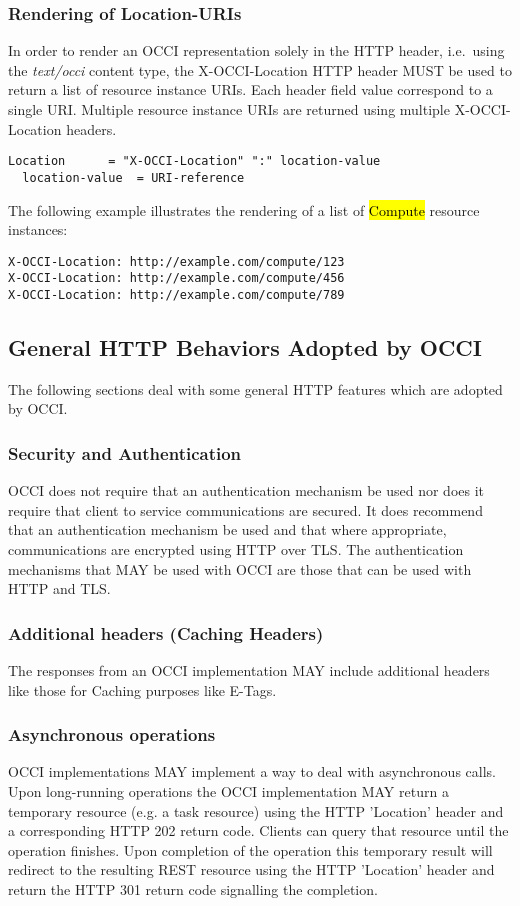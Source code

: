 \documentclass[10pt,a4paper]{article}
\begin{document}
\subsubsection{Rendering of Location-URIs}
In order to render an OCCI representation solely in the HTTP header,
i.e.~using the \textit{text/occi} content type, the X-OCCI-Location
HTTP header MUST be used to return a list of resource instance
URIs. Each header field value correspond to a single URI. Multiple
resource instance URIs are returned using multiple X-OCCI-Location
headers.

\begin{verbatim}
Location      = "X-OCCI-Location" ":" location-value
  location-value  = URI-reference
\end{verbatim}

The following example illustrates the rendering of a list of
\hl{Compute} resource instances:
\begin{verbatim}
X-OCCI-Location: http://example.com/compute/123
X-OCCI-Location: http://example.com/compute/456
X-OCCI-Location: http://example.com/compute/789
\end{verbatim}

\subsection{General HTTP Behaviors Adopted by OCCI}
The following sections deal with some general HTTP features which are
adopted by OCCI.

\subsubsection{Security and Authentication}
OCCI does not require that an authentication mechanism be used nor
does it require that client to service communications are secured. It
does recommend that an authentication mechanism be used and that where
appropriate, communications are encrypted using HTTP over TLS. The
authentication mechanisms that MAY be used with OCCI are those that
can be used with HTTP and TLS.

\subsubsection{Additional headers (Caching Headers)}
The responses from an OCCI implementation MAY include additional
headers like those for Caching purposes like E-Tags.

\subsubsection{Asynchronous operations}
OCCI implementations MAY implement a way to deal with asynchronous
calls. Upon long-running operations the OCCI implementation MAY return
a temporary resource (e.g. a task resource) using the HTTP 'Location'
header and a corresponding HTTP 202 return code. Clients can query
that resource until the operation finishes. Upon completion of the
operation this temporary result will redirect to the resulting REST
resource using the HTTP 'Location' header and return the HTTP 301
return code signalling the completion.
\end{document}
